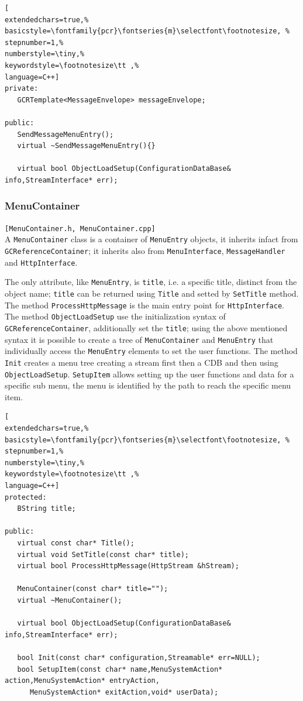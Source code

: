 \begin{lstlisting}[
extendedchars=true,%
basicstyle=\fontfamily{pcr}\fontseries{m}\selectfont\footnotesize, %
stepnumber=1,%
numberstyle=\tiny,%
keywordstyle=\footnotesize\tt ,%
language=C++]
private:
   GCRTemplate<MessageEnvelope> messageEnvelope;

public:
   SendMessageMenuEntry();
   virtual ~SendMessageMenuEntry(){}

   virtual bool ObjectLoadSetup(ConfigurationDataBase& info,StreamInterface* err);
\end{lstlisting}



\subsubsection{MenuContainer}
\texttt{[MenuContainer.h, MenuContainer.cpp]}\\
A \texttt{MenuContainer} class is a container of \texttt{MenuEntry} objects, it inherits infact from \texttt{GCReferenceContainer}; it inherits also from \texttt{MenuInterface}, \texttt{MessageHandler} and \texttt{HttpInterface}.

The only attribute, like \texttt{MenuEntry}, is \texttt{title}, i.e. a specific title, distinct from the object name; \texttt{title} can be returned using \texttt{Title} and setted by \texttt{SetTitle} method. The method \texttt{ProcessHttpMessage} is the main entry point for \texttt{HttpInterface}. \\


The method \texttt{ObjectLoadSetup} use the initialization syntax of \texttt{GCReferenceContainer}, additionally set the \texttt{title}; using the above mentioned syntax it is possible to create a tree of \texttt{MenuContainer} and \texttt{MenuEntry} that individually access the \texttt{MenuEntry} elements to set the user functions.
The method \texttt{Init} creates a menu tree creating a stream first then a CDB and then using \texttt{ObjectLoadSetup}. \texttt{SetupItem} allows setting up the user functions and data for a specific sub menu, the menu is identified by the path to reach the specific menu item.

\begin{lstlisting}[
extendedchars=true,%
basicstyle=\fontfamily{pcr}\fontseries{m}\selectfont\footnotesize, %
stepnumber=1,%
numberstyle=\tiny,%
keywordstyle=\footnotesize\tt ,%
language=C++]
protected:
   BString title;

public:
   virtual const char* Title();
   virtual void SetTitle(const char* title);
   virtual bool ProcessHttpMessage(HttpStream &hStream);

   MenuContainer(const char* title="");
   virtual ~MenuContainer();

   virtual bool ObjectLoadSetup(ConfigurationDataBase& info,StreamInterface* err);

   bool Init(const char* configuration,Streamable* err=NULL);
   bool SetupItem(const char* name,MenuSystemAction* action,MenuSystemAction* entryAction,
      MenuSystemAction* exitAction,void* userData);
\end{lstlisting}



